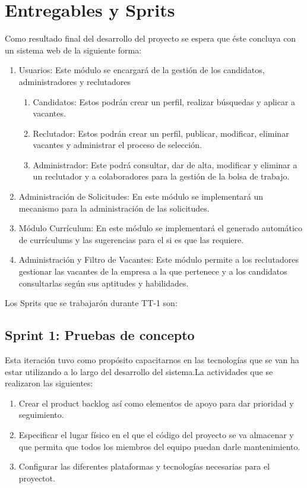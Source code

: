 \section{Entregables y Sprits}
Como resultado final del desarrollo del proyecto se espera que éste concluya con un sistema web de la siguiente forma:
\begin{enumerate}
    \item Usuarios: Este módulo se encargará de la gestión de los candidatos, administradores y
    reclutadores
    \begin{enumerate}
        \item Candidatos: Estos podrán crear un perfil, realizar búsquedas y aplicar a vacantes.
        \item Reclutador: Estos podrán crear un perfil, publicar, modificar, eliminar vacantes y administrar el
        proceso de selección.
        \item Administrador: Este podrá consultar, dar de alta, modificar y eliminar a un reclutador y a colaboradores para 
        la gestión de la bolsa de trabajo.
    \end{enumerate}

    \item Administración de Solicitudes: En este módulo se implementará un mecanismo para la administración
    de las solicitudes.
    \item Módulo Currículum: En este módulo se implementará el generado automático de currículums y las
    sugerencias para el si es que las requiere.
    \item Administración y Filtro de Vacantes: Este módulo permite a los reclutadores gestionar las
    vacantes de la empresa a la que pertenece y a los candidatos consultarlas según sus aptitudes y habilidades.
\end{enumerate}

Los Sprits que se trabajarón durante TT-1 son:

\subsection{Sprint 1: Pruebas de concepto}
Esta iteración tuvo como propósito capacitarnos en las tecnologías que se van ha estar utilizando 
a lo largo del desarrollo del sistema.La actividades que se realizaron las siguientes:

\begin{enumerate}
    \item Crear el product backlog así como elementos de apoyo para dar prioridad y seguimiento.
    \item Especificar el lugar físico en el que el código del proyecto se va almacenar y que permita que
    todos los miembros del equipo puedan darle mantenimiento.
    \item Configurar las diferentes plataformas y tecnologías necesarias para el proyectot.
\end{enumerate}

